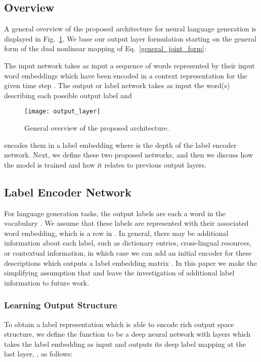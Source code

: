 \documentclass{article}
\begin{document}
\subsection{Overview}
A general overview of the proposed architecture for neural language generation is displayed in Fig.~\ref{drill_schema}.
We base our output layer formulation starting on the general form of the dual nonlinear mapping of Eq.~\ref{general_joint_form}:
 
The input network   takes as input a sequence of words represented by their input word embeddings  which have been encoded in a context representation  for the given time step .  The output or label network   takes as input the word(s) describing each possible output label and \begin{figure}[htp]
 	\centering
 	\hspace{5mm}\texttt{[image: output\_layer]}
 	\vspace{-3mm}
 	\caption{General overview of the proposed architecture.}
 	\vspace{-2mm}
 	\label{drill_schema}
\end{figure} encodes them in a label embedding  where  is the depth of the label encoder network. Next, we define these two proposed networks, and then we discuss how the model is trained and how it relates to previous output layers.
 
\subsection{Label Encoder Network}
 
For language generation tasks, the output labels are each a word in the vocabulary .  We assume that these labels are represented with their associated word embedding, which is a row in .  In general, there may be additional information about each label, such as dictionary entries, cross-lingual resources, or contextual information, in which case we can add an initial encoder for these descriptions which outputs a label embedding matrix .  In this paper we make the simplifying assumption that  and leave the investigation of additional label information to future work.


\subsubsection{Learning Output Structure}
To obtain a label representation which is able to encode rich output space structure, we define the  function to be a deep neural network with  layers which takes the label embedding  as input and outputs its deep label mapping at the last layer, ,  as follows: 
\end{document}
